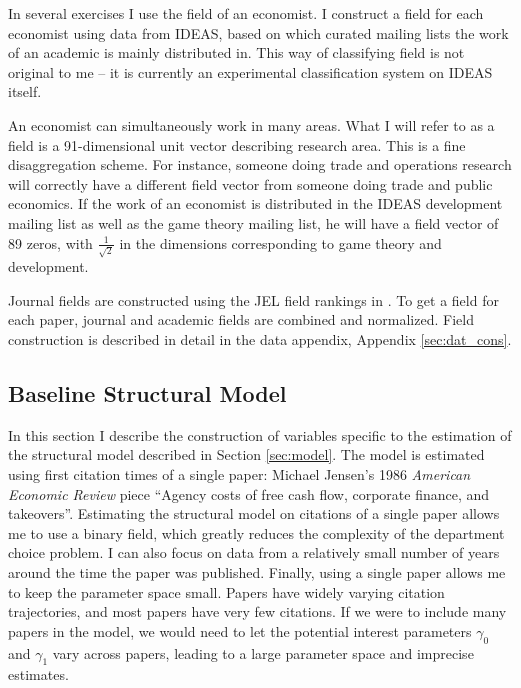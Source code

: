 In several exercises I use the field of an economist. I
construct a field for each economist using data from IDEAS, based on
which curated mailing lists the work of an academic is mainly distributed in. 
This way of classifying field is not original to me -- it is currently
an experimental classification system on IDEAS itself.

An economist can simultaneously work in many areas.  What I will refer to as a 
field is a 91-dimensional unit vector describing research area. This is a 
fine disaggregation scheme.  For instance, someone doing trade and operations research
will correctly have a different field vector from someone doing trade and public economics. 
If the work of an economist is distributed in the IDEAS development 
mailing list as well as the game theory mailing list, he will
have a field vector of 89 zeros, with $\frac{1}{\sqrt{2}}$ in the
dimensions corresponding to game theory and development. 

Journal fields are constructed using the JEL field rankings in \citet{barrett2000subdiscipline}.
To get a field for each paper, journal and academic fields are combined and normalized.
Field construction is described in detail in the data appendix, Appendix \ref{sec:dat_cons}.

\subsection{Baseline Structural Model}
\label{sec:struct_dat}

In this section I describe the construction of variables specific to the estimation
of the structural model described in Section \ref{sec:model}.  The model is
estimated using first citation
times of a single paper: Michael Jensen's 1986 \emph{American Economic
Review} piece ``Agency costs of free cash
flow, corporate finance, and takeovers''.
Estimating the structural model on
citations of a single paper allows me to use a binary field,
which greatly reduces the complexity of the department choice problem.
I can also focus on data from a relatively small number of years around the time the paper
was published.  Finally, using a single paper allows me to keep the parameter 
space small.  Papers have widely varying citation trajectories, and most
papers have very few citations.  If we were to include many papers in the model,
we would need to let the potential interest parameters  $\gamma_0$ and $\gamma_1$
vary across papers, leading to a large parameter space and imprecise estimates.\footnotemark{}

